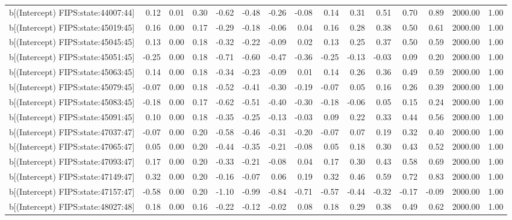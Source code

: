 \begin{table}[ht]
\begin{tabular}{rrrrrrrrrrrrrrr}
  b[(Intercept) FIPS:state:44007:44] & 0.12 & 0.01 & 0.30 & -0.62 & -0.48 & -0.26 & -0.08 & 0.14 & 0.31 & 0.51 & 0.70 & 0.89 & 2000.00 & 1.00 \\ 
  b[(Intercept) FIPS:state:45019:45] & 0.16 & 0.00 & 0.17 & -0.29 & -0.18 & -0.06 & 0.04 & 0.16 & 0.28 & 0.38 & 0.50 & 0.61 & 2000.00 & 1.00 \\ 
  b[(Intercept) FIPS:state:45045:45] & 0.13 & 0.00 & 0.18 & -0.32 & -0.22 & -0.09 & 0.02 & 0.13 & 0.25 & 0.37 & 0.50 & 0.59 & 2000.00 & 1.00 \\ 
  b[(Intercept) FIPS:state:45051:45] & -0.25 & 0.00 & 0.18 & -0.71 & -0.60 & -0.47 & -0.36 & -0.25 & -0.13 & -0.03 & 0.09 & 0.20 & 2000.00 & 1.00 \\ 
  b[(Intercept) FIPS:state:45063:45] & 0.14 & 0.00 & 0.18 & -0.34 & -0.23 & -0.09 & 0.01 & 0.14 & 0.26 & 0.36 & 0.49 & 0.59 & 2000.00 & 1.00 \\ 
  b[(Intercept) FIPS:state:45079:45] & -0.07 & 0.00 & 0.18 & -0.52 & -0.41 & -0.30 & -0.19 & -0.07 & 0.05 & 0.16 & 0.26 & 0.39 & 2000.00 & 1.00 \\ 
  b[(Intercept) FIPS:state:45083:45] & -0.18 & 0.00 & 0.17 & -0.62 & -0.51 & -0.40 & -0.30 & -0.18 & -0.06 & 0.05 & 0.15 & 0.24 & 2000.00 & 1.00 \\ 
  b[(Intercept) FIPS:state:45091:45] & 0.10 & 0.00 & 0.18 & -0.35 & -0.25 & -0.13 & -0.03 & 0.09 & 0.22 & 0.33 & 0.44 & 0.56 & 2000.00 & 1.00 \\ 
  b[(Intercept) FIPS:state:47037:47] & -0.07 & 0.00 & 0.20 & -0.58 & -0.46 & -0.31 & -0.20 & -0.07 & 0.07 & 0.19 & 0.32 & 0.40 & 2000.00 & 1.00 \\ 
  b[(Intercept) FIPS:state:47065:47] & 0.05 & 0.00 & 0.20 & -0.44 & -0.35 & -0.21 & -0.08 & 0.05 & 0.18 & 0.30 & 0.43 & 0.52 & 2000.00 & 1.00 \\ 
  b[(Intercept) FIPS:state:47093:47] & 0.17 & 0.00 & 0.20 & -0.33 & -0.21 & -0.08 & 0.04 & 0.17 & 0.30 & 0.43 & 0.58 & 0.69 & 2000.00 & 1.00 \\ 
  b[(Intercept) FIPS:state:47149:47] & 0.32 & 0.00 & 0.20 & -0.16 & -0.07 & 0.06 & 0.19 & 0.32 & 0.46 & 0.59 & 0.72 & 0.83 & 2000.00 & 1.00 \\ 
  b[(Intercept) FIPS:state:47157:47] & -0.58 & 0.00 & 0.20 & -1.10 & -0.99 & -0.84 & -0.71 & -0.57 & -0.44 & -0.32 & -0.17 & -0.09 & 2000.00 & 1.00 \\ 
  b[(Intercept) FIPS:state:48027:48] & 0.18 & 0.00 & 0.16 & -0.22 & -0.12 & -0.02 & 0.08 & 0.18 & 0.29 & 0.38 & 0.49 & 0.62 & 2000.00 & 1.00 \\ 

\end{tabular}
\end{table}
